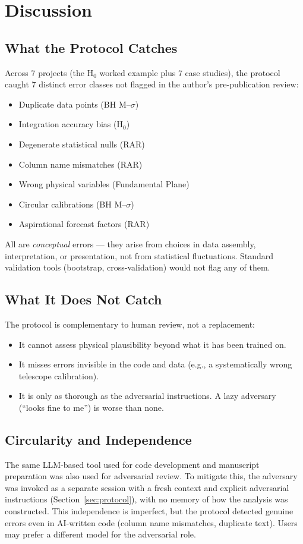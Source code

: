 \documentclass[twocolumn]{aastex631}
\begin{document}
\section{Discussion}
\label{sec:discussion}

\subsection{What the Protocol Catches}
Across 7 projects (the H$_0$ worked example plus 7 case studies), the
protocol caught 7 distinct error classes not flagged in the author's
pre-publication review:
\begin{itemize}
  \item Duplicate data points (BH M--$\sigma$)
  \item Integration accuracy bias (H$_0$)
  \item Degenerate statistical nulls (RAR)
  \item Column name mismatches (RAR)
  \item Wrong physical variables (Fundamental Plane)
  \item Circular calibrations (BH M--$\sigma$)
  \item Aspirational forecast factors (RAR)
\end{itemize}
All are \emph{conceptual} errors --- they arise from choices in
data assembly, interpretation, or presentation, not from statistical
fluctuations.  Standard validation tools (bootstrap, cross-validation)
would not flag any of them.

\subsection{What It Does Not Catch}
The protocol is complementary to human review, not a replacement:
\begin{itemize}
  \item It cannot assess physical plausibility beyond what it has been
        trained on.
  \item It misses errors invisible in the code and data (e.g., a
        systematically wrong telescope calibration).
  \item It is only as thorough as the adversarial instructions.
        A lazy adversary (``looks fine to me'') is worse than none.
\end{itemize}

\subsection{Circularity and Independence}
The same LLM-based tool used for code development and manuscript
preparation was also used for adversarial review.  To mitigate this,
the adversary was invoked as a separate session with a fresh context
and explicit adversarial instructions (Section~\ref{sec:protocol}),
with no memory of how the analysis was constructed.  This independence
is imperfect, but the protocol detected genuine errors even in
AI-written code (column name mismatches, duplicate text).  Users may
prefer a different model for the adversarial role.
\end{document}
